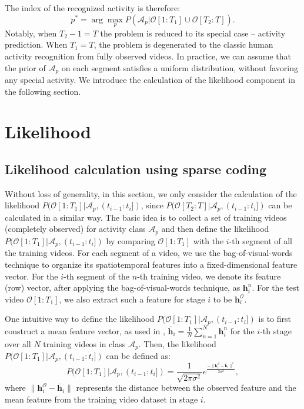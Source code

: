 The index of the recognized activity is therefore:
\begin{equation}
  p^* = \arg\max_p P(\mathcal{A}_p | \mathcal{O}[1:T_1]\cup \mathcal{O}[T_2:T]).
  \label{eq:maximization}
\end{equation}
Notably, when $T_2-1 = T$ the problem is {\color{black}reduced} to
{\color{black}its special case -- activity prediction}.  When $T_1 = T$, the
problem is degenerated to the classic human activity recognition from fully
observed videos.  {\color{black}In practice}, we can assume that the prior of
$\mathcal{A}_p$ on each segment satisfies a uniform distribution, without
favoring any special activity.  We introduce the calculation of the likelihood
component in the following section.

\section{Likelihood}
\label{sec:likelihood}

\subsection{Likelihood calculation using sparse coding}
\label{sec:likelihood_SC}
Without loss of generality, in this section, we only consider the calculation
of the likelihood $P(\mathcal{O}[1:T_1]|\mathcal{A}_p, (t_{i-1}:t_i])$, since
$P(\mathcal{O}[T_2:T]|\mathcal{A}_p, (t_{i-1}:t_i])$ can be calculated in a
similar way. The basic idea is to collect a set of training videos (completely
observed) for activity class $\mathcal{A}_p$ and then define the likelihood
$P(\mathcal{O}[1:T_1]|\mathcal{A}_p, (t_{i-1}:t_i])$ by comparing
$\mathcal{O}[1:T_1]$ with the $i$-th segment of all the training videos. For
each segment of a video, we use the bag-of-visual-words technique to
{\color{black}organize} its spatiotemporal features {\color{black}into} a
fixed-dimensional feature vector. For the $i$-th segment of the $n$-th training
video, we denote its feature (row) vector, after applying the
bag-of-visual-words technique, as $\mathbf{h}^n_i$. For the test video
$\mathcal{O}[1:T_1]$, we also extract such a feature for stage $i$ to be
$\mathbf{h}^{\mathcal{O}}_i$.

One intuitive way to define the likelihood $P(\mathcal{O}[1:T_1]|\mathcal{A}_p,
(t_{i-1}:t_i])$ is to first construct a mean feature vector, as used in
\cite{Ryoo2011}, $\bar{\mathbf{h}}_i=\frac{1}{N}\sum_{n=1}^N \mathbf{h}^n_i$
for the $i$-th stage over all $N$ training videos in class $\mathcal{A}_p$.
Then, the likelihood $P(\mathcal{O}[1:T_1]|\mathcal{A}_p, (t_{i-1}:t_i])$ can
be defined as: %
\begin{equation}
  \label{eq:likelihood definition}
  P(\mathcal{O}[1:T_1]|\mathcal{A}_p, (t_{i-1}:t_i]) = \frac{1}{\sqrt{2\pi\sigma^2}}e^{\frac{-\|\mathbf{h}^{\mathcal{O}}_i
      -\bar{\mathbf{h}}_i\|^2}{2\sigma^2}},
\end{equation}
where $\|\mathbf{h}^{\mathcal{O}}_i-\bar{\mathbf{h}}_i\|$ represents the
distance between the observed feature and the mean feature from the training
video dataset in stage $i$.


